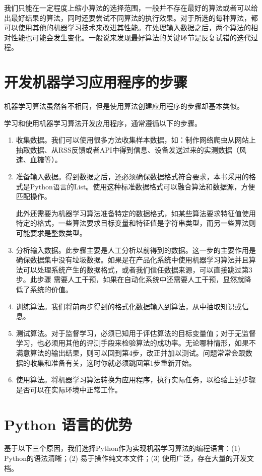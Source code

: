 我们只能在一定程度上缩小算法的选择范围，一般并不存在最好的算法或者可以给出最好结果的算法，同时还要尝试不同算法的执行效果。对于所选的每种算法，都可以使用其他的机器学习技术来改进其性能。在处理输入数据之后，两个算法的相对性能也可能会发生变化。一般说来发现最好算法的关键环节是反复试错的迭代过程。
\section{开发机器学习应用程序的步骤}
机器学习算法虽然各不相同，但是使用算法创建应用程序的步骤却基本类似。

学习和使用机器学习算法开发应用程序，通常遵循以下的步骤。

\begin{enumerate}
    \item 收集数据。我们可以使用很多方法收集样本数据，如：制作网络爬虫从网站上抽取数据、从RSS反馈或者API中得到信息、设备发送过来的实测数据（风速、血糖等）。
    \item  准备输入数据。得到数据之后，还必须确保数据格式符合要求，本书采用的格式是Python语言的List。使用这种标准数据格式可以融合算法和数据源，方便匹配操作。

          此外还需要为机器学习算法准备特定的数据格式，如某些算法要求特征值使用特定的格式，一些算法要求目标变量和特征值是字符串类型，而另一些算法则可能要求是整数类型。
    \item 分析输入数据。此步骤主要是人工分析以前得到的数据。这一步的主要作用是确保数据集中没有垃圾数据。如果是在产品化系统中使用机器学习算法并且算法可以处理系统产生的数据格式，或者我们信任数据来源，可以直接跳过第3步。此步骤
          需要人工干预，如果在自动化系统中还需要人工干预，显然就降低了系统的价值。
    \item 训练算法。我们将前两步得到的格式化数据输入到算法，从中抽取知识或信息。
    \item  测试算法。对于监督学习，必须已知用于评估算法的目标变量值；对于无监督学习，也必须用其他的评测手段来检验算法的成功率。无论哪种情形，如果不满意算法的输出结果，则可以回到第4步，改正并加以测试。问题常常会跟数据的收集和准备有关，这时你就必须跳回第1步重新开始。
    \item 使用算法。将机器学习算法转换为应用程序，执行实际任务，以检验上述步骤是否可以在实际环境中正常工作。
\end{enumerate}

\section{Python 语言的优势}
基于以下三个原因，我们选择Python作为实现机器学习算法的编程语言：(1) Python的语法清晰；(2) 易于操作纯文本文件；(3) 使用广泛，存在大量的开发文档。


